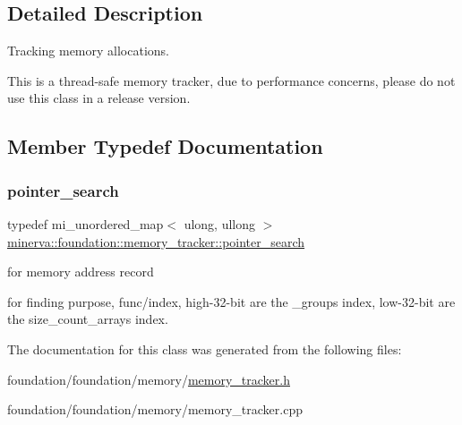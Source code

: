 \subsection{Detailed Description}
Tracking memory allocations. 

This is a thread-\/safe memory tracker, due to performance concerns, please do not use this class in a release version. 

\subsection{Member Typedef Documentation}
\mbox{\label{classminerva_1_1foundation_1_1memory__tracker_a1440e17c5c56740dce312e2b49a48199}} 
\subsubsection{\texorpdfstring{pointer\+\_\+search}{pointer\_search}}
{\footnotesize\ttfamily typedef mi\+\_\+unordered\+\_\+map$<$ ulong, ullong $>$ \hyperlink{classminerva_1_1foundation_1_1memory__tracker_a1440e17c5c56740dce312e2b49a48199}{minerva\+::foundation\+::memory\+\_\+tracker\+::pointer\+\_\+search}\hspace{0.3cm}{\ttfamily [protected]}}



for memory address record 

for finding purpose, func/index, high-\/32-\/bit are the \+\_\+groups\textquotesingle{} index, low-\/32-\/bit are the size\+\_\+count\+\_\+array\textquotesingle{}s index. 

The documentation for this class was generated from the following files\+:\begin{DoxyCompactItemize}
\item 
foundation/foundation/memory/\hyperlink{memory__tracker_8h}{memory\+\_\+tracker.\+h}\item 
foundation/foundation/memory/memory\+\_\+tracker.\+cpp\end{DoxyCompactItemize}
